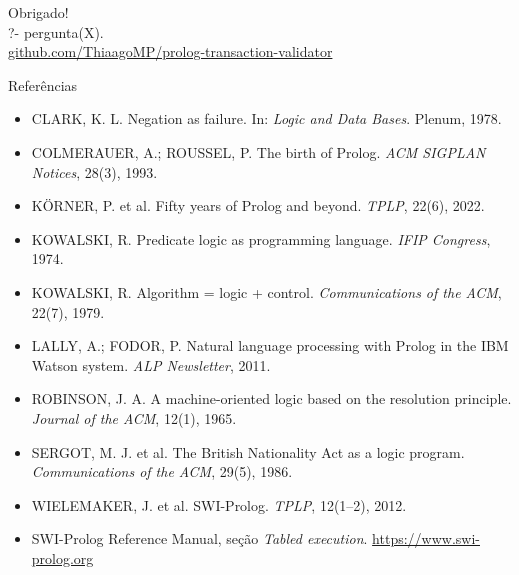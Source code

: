 \documentclass[aspectratio=169,11pt,xcolor=table]{beamer}
\begin{document}
\begin{frame}[standout]
  Obrigado!\\[10pt]
  {\normalsize\ttfamily ?- pergunta(X).}\\[18pt]
  {\scriptsize\normalfont \href{https://github.com/ThiaagoMP/prolog-transaction-validator}{github.com/ThiaagoMP/prolog-transaction-validator}}
\end{frame}

\appendix

\begin{frame}{Referências}
  \scriptsize
  \begin{itemize}
    \setlength{\itemsep}{2pt}
    \item CLARK, K. L. Negation as failure. In: \emph{Logic and Data Bases}. Plenum, 1978.
    \item COLMERAUER, A.; ROUSSEL, P. The birth of Prolog. \emph{ACM SIGPLAN Notices}, 28(3), 1993.
    \item KÖRNER, P. et al. Fifty years of Prolog and beyond. \emph{TPLP}, 22(6), 2022.
    \item KOWALSKI, R. Predicate logic as programming language. \emph{IFIP Congress}, 1974.
    \item KOWALSKI, R. Algorithm = logic + control. \emph{Communications of the ACM}, 22(7), 1979.
    \item LALLY, A.; FODOR, P. Natural language processing with Prolog in the IBM Watson system. \emph{ALP Newsletter}, 2011.
    \item ROBINSON, J. A. A machine-oriented logic based on the resolution principle. \emph{Journal of the ACM}, 12(1), 1965.
    \item SERGOT, M. J. et al. The British Nationality Act as a logic program. \emph{Communications of the ACM}, 29(5), 1986.
    \item WIELEMAKER, J. et al. SWI-Prolog. \emph{TPLP}, 12(1--2), 2012.
    \item SWI-Prolog Reference Manual, seção \emph{Tabled execution}. \url{https://www.swi-prolog.org}
  \end{itemize}
\end{frame}
\end{document}
